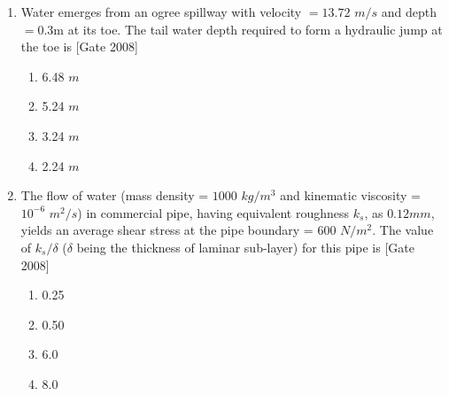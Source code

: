 \documentclass[journal]{IEEEtran}
\begin{document}
\begin{enumerate}
	\item Water emerges from an ogree spillway with velocity $= 13.72$ $m/s$ and depth $= 0.3$m at its toe. The tail water depth required to form a hydraulic jump at the toe is \hfill [Gate 2008]
\begin{multicols}{4}
	\begin{enumerate}
		\item 6.48 $m$
		\item 5.24 $m$
		\item 3.24 $m$
		\item 2.24 $m$
	\end{enumerate}
\end{multicols}
	\item The flow of water (mass density = $1000$ $kg/m^3$ and kinematic viscosity = $10^{-6}$ $m^2/s$) in commercial pipe, having equivalent roughness $k_s$, as $0.12mm$, yields an average shear stress at the pipe boundary = $600$ $N/m^2$. The value of $k_s / \delta$ ($\delta$ being the thickness of laminar sub-layer) for this pipe is  \hfill [Gate 2008]
		\begin{multicols}{4}
	\begin{enumerate}
		\item 0.25
		\item 0.50
		\item 6.0
		\item 8.0
	\end{enumerate}
\end{multicols}


\end{enumerate}
\end{document}
